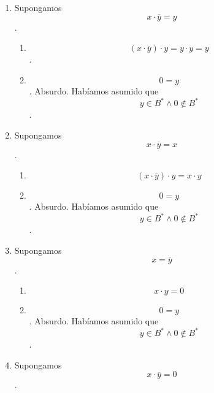 \documentclass[
]{article}
\providecommand{\tightlist}{%
  \setlength{\itemsep}{0pt}\setlength{\parskip}{0pt}}
\begin{document}
\begin{enumerate}
\begin{enumerate}
\begin{enumerate}
\begin{enumerate}
        \begin{enumerate}
        \def\labelenumv{\arabic{enumv}.}
        \item
          Supongamos \[{x \cdot \overline{y}} = y\].

          \begin{enumerate}
          \def\labelenumvi{\arabic{enumvi}.}
          \tightlist
          \item
            \[{{{({x \cdot \overline{y}})} \cdot y} = {y \cdot y}} = y\].
          \item
            \[0 = y\]. Absurdo. Habíamos asumido que
            \[{y \in {B^{\ast} \land 0}} \notin B^{\ast}\].
          \end{enumerate}
        \item
          Supongamos \[{x \cdot \overline{y}} = x\].

          \begin{enumerate}
          \def\labelenumvi{\arabic{enumvi}.}
          \tightlist
          \item
            \[{{({x \cdot \overline{y}})} \cdot y} = {x \cdot y}\]
          \item
            \[0 = y\]. Absurdo. Habíamos asumido que
            \[{y \in {B^{\ast} \land 0}} \notin B^{\ast}\].
          \end{enumerate}
        \item
          Supongamos \[x = \overline{y}\].

          \begin{enumerate}
          \def\labelenumvi{\arabic{enumvi}.}
          \tightlist
          \item
            \[{x \cdot y} = 0\]
          \item
            \[0 = y\]. Absurdo. Habíamos asumido que
            \[{y \in {B^{\ast} \land 0}} \notin B^{\ast}\].
          \end{enumerate}
        \item
          Supongamos \[{x \cdot \overline{y}} = 0\].


\end{enumerate}
\end{enumerate}
\end{enumerate}
\end{enumerate}
\end{enumerate}
\end{document}
